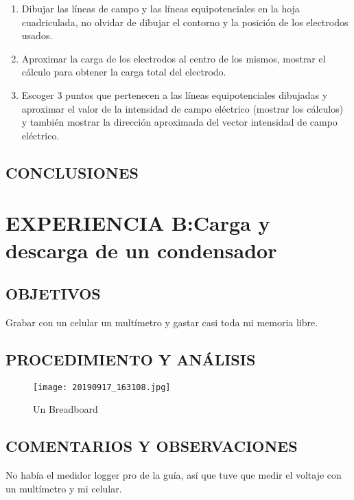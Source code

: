 \documentclass[10pt, twoside]{article}
\begin{document}
\begin{enumerate}[label=\roman*]
	\item Dibujar las líneas de campo y las líneas equipotenciales en la hoja
		cuadriculada, no olvidar de dibujar el contorno y la posición de los
		electrodos usados.
	\item Aproximar la carga de los electrodos al centro de los mismos,
		mostrar el cálculo para obtener la carga total del electrodo.
	\item Escoger $3$ puntos que pertenecen a las líneas equipotenciales
		dibujadas y aproximar el valor de la intensidad de campo
		eléctrico (mostrar los cálculos) y también mostrar la dirección
		aproximada del vector intensidad de campo eléctrico.
\end{enumerate}

\subsection{CONCLUSIONES}%


\section{EXPERIENCIA B:Carga y descarga de un condensador}%

\subsection{OBJETIVOS}%

Grabar con un celular un multímetro y gastar casi toda mi
memoria libre.

\subsection{PROCEDIMIENTO Y ANÁLISIS}%

\begin{figure}[H]
	\centering
	\texttt{[image: 20190917\_163108.jpg]}
	\caption{Un Breadboard}%
	\label{fig:bread}
\end{figure}

\subsection{COMENTARIOS Y OBSERVACIONES}%

No había el medidor logger pro de la guía,
así que tuve que medir el voltaje con un multímetro y mi celular.
\end{document}
